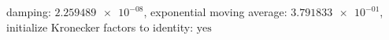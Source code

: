damping: $\num[scientific-notation=true]{2.259489e-08}$, exponential moving average: $\num[scientific-notation=true]{3.791833e-01}$, initialize Kronecker factors to identity: $\text{yes}$